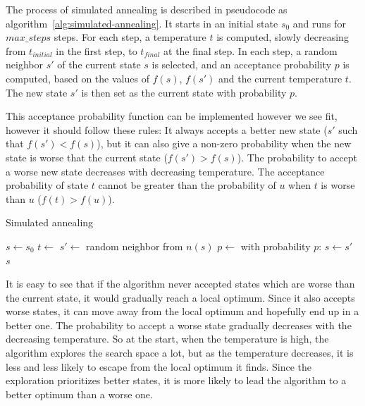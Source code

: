 The process of simulated annealing is described in pseudocode as algorithm~\ref{alg:simulated-annealing}.
It starts in an initial state $s_0$ and runs for $max\_steps$ steps.
For each step, a temperature $t$ is computed, slowly decreasing from $t_{initial}$ in the first step, to $t_{final}$ at the final step.
In each step, a random neighbor $s'$ of the current state $s$ is selected, and an acceptance probability $p$ is computed, based on the values of $f(s)$, $f(s')$ and the current temperature $t$.
The new state $s'$ is then set as the current state with probability $p$.

This acceptance probability function can be implemented however we see fit, however it should follow these rules:
It always accepts a better new state ($s'$ such that $f(s') < f(s)$), but it can also give a non-zero probability when the new state is worse that the current state ($f(s') > f(s)$).
The probability to accept a worse new state decreases with decreasing temperature.
The acceptance probability of state $t$ cannot be greater than the probability of $u$ when $t$ is worse than $u$ ($f(t) > f(u)$).

\begin{algorithm}[H]
    \caption{Simulated annealing}
    \label{alg:simulated-annealing}
    \begin{algorithmic}[1]
        \State $s \gets s_0$
        \State $t \gets$ 
        \State $s' \gets$ random neighbor from $n(s)$
        \State $p \gets$ 
        \State with probability $p$: $s \gets s'$
        \EndFor\\
        \Return $s$
        \Statex
    \end{algorithmic}
\end{algorithm}

It is easy to see that if the algorithm never accepted states which are worse than the current state, it would gradually reach a local optimum.
Since it also accepts worse states, it can move away from the local optimum and hopefully end up in a better one.
The probability to accept a worse state gradually decreases with the decreasing temperature.
So at the start, when the temperature is high, the algorithm explores the search space a lot, but as the temperature decreases, it is less and less likely to escape from the local optimum it finds.
Since the exploration prioritizes better states, it is more likely to lead the algorithm to a better optimum than a worse one.

